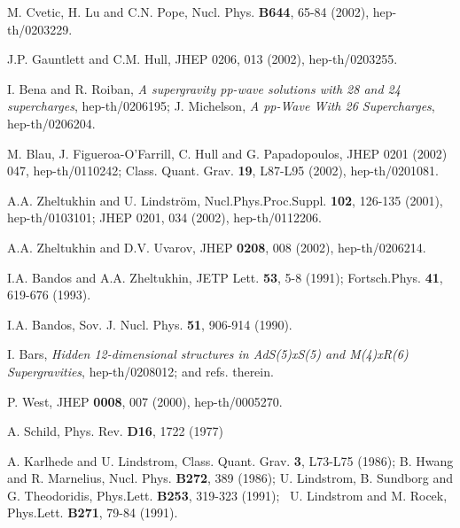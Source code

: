 \documentclass[a4paper,11pt]{article}
\begin{document}
{\begin{thebibliography}{99}
M. Cvetic, H. Lu and C.N. Pope, 
Nucl. Phys. {\bf B644}, 65-84 (2002), 
hep-th/0203229. 

J.P. Gauntlett and C.M. Hull, 
JHEP 0206, 013 (2002), 
hep-th/0203255. 

I. Bena and R. Roiban, {\sl A supergravity pp-wave solutions with 
28 and 24 supercharges}, hep-th/0206195; 
J. Michelson, {\sl A pp-Wave With 26 Supercharges}, 
hep-th/0206204.

 M. Blau, J. Figueroa-O'Farrill, C. Hull and G. Papadopoulos, 
JHEP 0201 (2002) 047, hep-th/0110242; 
Class. Quant. Grav. {\bf 19}, L87-L95 (2002), hep-th/0201081.         


 A.A. Zheltukhin and U. Lindstr\"{o}m,  
Nucl.Phys.Proc.Suppl. {\bf 102}, 126-135 (2001),  hep-th/0103101;
JHEP 0201, 034 (2002), hep-th/0112206.  

 A.A. Zheltukhin and D.V. Uvarov, 
JHEP {\bf 0208}, 008 (2002), hep-th/0206214. 

   I.A. Bandos and A.A. Zheltukhin, 
JETP Lett. {\bf 53}, 5-8 (1991);  
Fortsch.Phys. {\bf 41}, 619-676 
(1993).  

I.A. Bandos, 
Sov. J. Nucl. Phys. {\bf 51}, 906-914 (1990). 

I. Bars, 
{\sl Hidden 12-dimensional structures in 
AdS(5)xS(5) and M(4)xR(6) Supergravities}, 
hep-th/0208012; and refs. therein. 

P. West, JHEP {\bf 0008}, 007 (2000), hep-th/0005270.

A. Schild, Phys. Rev. {\bf D16}, 1722 (1977)

A. Karlhede and U. Lindstrom,  
Class. Quant. Grav. {\bf 3}, L73-L75 (1986);  
B. Hwang and R. Marnelius, Nucl. Phys. {\bf B272}, 389 (1986); 
U. Lindstrom, B. Sundborg and  G. Theodoridis, 
Phys.Lett. {\bf B253}, 319-323 (1991); \,  
U. Lindstrom and M. Rocek, 
Phys.Lett. {\bf B271}, 79-84 (1991).  



\end{thebibliography}}
\end{document}
